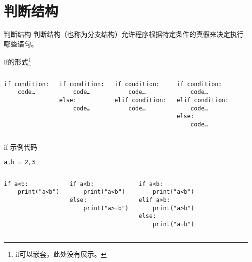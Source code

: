 \documentclass{beamer}
\begin{document}
\section{判断结构}
\begin{frame}[fragile]{判断结构}
判断结构（也称为分支结构）允许程序根据特定条件的真假来决定执行哪些语句。
\begin{block}{if的形式\footnote{if可以嵌套，此处没有展示。}}
\begin{columns}
\begin{Verbatim}[numbers=none,frame=single,rulecolor=\color{red}]
if condition:
    code…
\end{Verbatim}
\begin{Verbatim}[numbers=none,frame=single,rulecolor=\color{red}]
if condition:
    code…
else:
    code…
\end{Verbatim}
\begin{Verbatim}[numbers=none,frame=single,rulecolor=\color{red}]
if condition:
    code…
elif condition:
    code…
\end{Verbatim}
\begin{Verbatim}[numbers=none,frame=single,rulecolor=\color{red}]
if condition:
    code…
elif condition:
    code…
else:
    code…
\end{Verbatim}
\end{columns}

\end{block}
\end{frame}
\begin{frame}[fragile]{if 示例代码}
\begin{Verbatim}[numbers=none,frame=single,rulecolor=\color{red}]
a,b = 2,3
\end{Verbatim}
\begin{columns}
\begin{Verbatim}[numbers=none,frame=single,rulecolor=\color{red}]
if a<b:
    print("a<b")
    \end{Verbatim}
\begin{Verbatim}[numbers=none,frame=single,rulecolor=\color{red}]
if a<b:
    print("a<b")
else:
    print("a>=b")
\end{Verbatim}
\begin{Verbatim}[numbers=none,frame=single,rulecolor=\color{red}]
if a<b:
    print("a<b")
elif a>b:
    print("a>b")
else:
    print("a=b")
\end{Verbatim}
\end{columns}
\end{frame}
\end{document}
